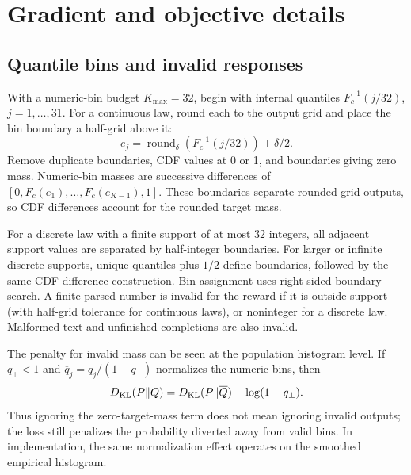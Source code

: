\section{Gradient and objective details}
\subsection{Quantile bins and invalid responses}
\label{app:bins}
With a numeric-bin budget $K_{\max}=32$, begin with internal quantiles
$F_c^{-1}(j/32)$, $j=1,\ldots,31$. For a continuous law, round each to
the output grid and place the bin boundary a half-grid above it:
\begin{equation}
 e_j=\operatorname{round}_{\delta}\!\left(F_c^{-1}(j/32)\right)+\delta/2.
\end{equation}
Remove duplicate boundaries, CDF values at 0 or 1, and boundaries giving
zero mass. Numeric-bin masses are successive differences of
$[0,F_c(e_1),\ldots,F_c(e_{K-1}),1]$. These boundaries separate rounded
grid outputs, so CDF differences account for the rounded target mass.

For a discrete law with a finite support of at most 32 integers, all
adjacent support values are separated by half-integer boundaries. For
larger or infinite discrete supports, unique quantiles plus $1/2$ define
boundaries, followed by the same CDF-difference construction. Bin
assignment uses right-sided boundary search. A finite parsed number is
invalid for the reward if it is outside support (with half-grid tolerance
for continuous laws), or noninteger for a discrete law. Malformed text
and unfinished completions are also invalid.

The penalty for invalid mass can be seen at the population histogram
level. If $q_\bot<1$ and $\overline q_j=q_j/(1-q_\bot)$ normalizes the
numeric bins, then
\begin{equation}
 D_{\mathrm{KL}}(P\Vert Q)=D_{\mathrm{KL}}(P\Vert\overline Q)-\log(1-q_\bot).
 \label{eq:invalidpenalty}
\end{equation}
Thus ignoring the zero-target-mass term does not mean ignoring invalid
outputs; the loss still penalizes the probability diverted away from
valid bins. In implementation, the same normalization effect operates on
the smoothed empirical histogram.

